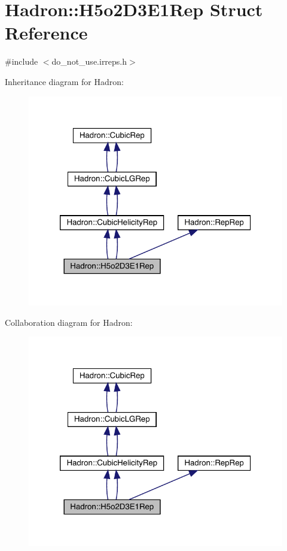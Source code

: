 \hypertarget{structHadron_1_1H5o2D3E1Rep}{}\section{Hadron\+:\+:H5o2\+D3\+E1\+Rep Struct Reference}
\label{structHadron_1_1H5o2D3E1Rep}


{\ttfamily \#include $<$do\+\_\+not\+\_\+use.\+irreps.\+h$>$}



Inheritance diagram for Hadron\+:\nopagebreak
\begin{figure}[H]
\begin{center}
\leavevmode
\includegraphics[width=320pt]{d9/d82/structHadron_1_1H5o2D3E1Rep__inherit__graph}
\end{center}
\end{figure}


Collaboration diagram for Hadron\+:\nopagebreak
\begin{figure}[H]
\begin{center}
\leavevmode
\includegraphics[width=320pt]{dc/d6d/structHadron_1_1H5o2D3E1Rep__coll__graph}
\end{center}
\end{figure}
